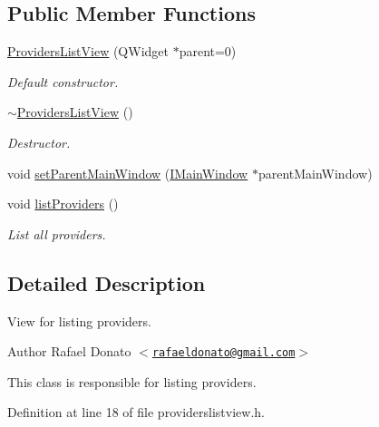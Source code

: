 \subsection*{\-Public \-Member \-Functions}
\begin{DoxyCompactItemize}
\item 
\hyperlink{class_providers_list_view_a15d25d41c7d576f0b802f249d33105de}{\-Providers\-List\-View} (\-Q\-Widget $\ast$parent=0)
\begin{DoxyCompactList}\small\item\em \-Default constructor. \end{DoxyCompactList}\item 
\hyperlink{class_providers_list_view_a0a0a1efea6f38c09d1ffa533ed52be94}{$\sim$\-Providers\-List\-View} ()
\begin{DoxyCompactList}\small\item\em \-Destructor. \end{DoxyCompactList}\item 
void \hyperlink{class_providers_list_view_a36acfebfca10c11ff0e3dbdb0aa469dd}{set\-Parent\-Main\-Window} (\hyperlink{class_i_main_window}{\-I\-Main\-Window} $\ast$parent\-Main\-Window)
\item 
void \hyperlink{class_providers_list_view_ad329553322c1f5c86988768f37dd243d}{list\-Providers} ()
\begin{DoxyCompactList}\small\item\em \-List all providers. \end{DoxyCompactList}\end{DoxyCompactItemize}


\subsection{\-Detailed \-Description}
\-View for listing providers. 

\begin{DoxyAuthor}{\-Author}
\-Rafael \-Donato $<$\href{mailto:rafaeldonato@gmail.com}{\tt rafaeldonato@gmail.\-com}$>$
\end{DoxyAuthor}
\-This class is responsible for listing providers. 

\-Definition at line 18 of file providerslistview.\-h.



